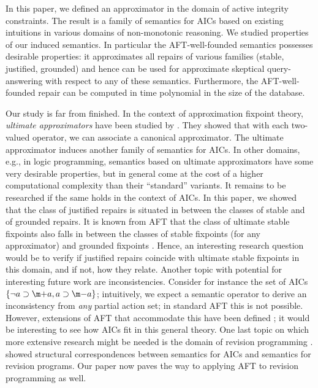 In this paper, we defined an approximator in the domain of active integrity constraints. 
The result is a family of semantics for AICs based on existing intuitions in various domains of non-monotonic reasoning. 
We studied properties of our induced semantics. 
In particular the AFT-well-founded semantics possesses desirable properties: it approximates all repairs of various families (stable, justified, grounded) and hence can be used for approximate skeptical query-answering with respect to any of these semantics. 
Furthermore, the AFT-well-founded repair can be computed in time polynomial in the size of the database. 

Our study is far from finished. 
In the context of approximation fixpoint theory, \emph{ultimate approximators} have been studied by \citet{DeneckerMT04}. 
They showed that with each two-valued operator, we can associate a canonical approximator. 
The ultimate approximator induces another family of semantics for AICs. 
In other domains, e.g., in logic programming, semantics based on ultimate approximators have some very desirable properties, but in general come at the cost of a higher computational complexity than their ``standard'' variants. 
It remains to be researched if the same holds in the context of AICs. 
In this paper, we showed that the class of justified repairs is situated in between the classes of stable and of grounded repairs. 
It is known from AFT that the class of ultimate stable fixpoints also falls in between the classes of stable fixpoints (for any approximator) and grounded fixpoints . 
Hence, an interesting research question would be to verify if justified repairs coincide with ultimate stable fixpoints in this domain, and if not, how they relate. 
Another topic with potential for interesting future work are inconsistencies. Consider for instance the set of AICs $\{\lnot a \aicrule \add a, a \aicrule \remove a\}$; intuitively, we expect a semantic operator to derive an inconsistency from \emph{any} partial action set; in standard AFT this is not possible. However, extensions of AFT that accommodate this have been defined \cite{RR/BiJF14}; it would be interesting to see how AICs fit in this general theory. 
One last topic on which more extensive research might be needed is the domain of revision programming \cite{tcs/MarekT98}. \citet{tplp/CaropreseT11} showed structural correspondences between semantics for AICs and semantics for revision programs. 
Our paper now paves the way to applying AFT to revision programming as well. 

% 
% 
% 
% 
% 

